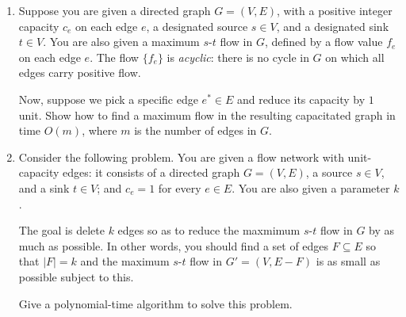 \documentclass[12pt]{article}
\begin{document}
\begin{enumerate}


\item 

Suppose you are given a directed graph $G = (V,E)$, with
a positive integer capacity $c_e$ on each edge $e$,
a designated source $s \in V$, and a designated sink $t \in V$.
You are also given a maximum $s$-$t$ flow in $G$,
defined by a flow value $f_e$ on each edge $e$.
The flow $\{f_e\}$ is {\em acyclic}: there is
no cycle in $G$ on which all edges carry positive flow.

Now, suppose we pick a specific edge $e^* \in E$
and reduce its capacity by $1$ unit.
Show how to find a maximum flow in the resulting
capacitated graph in time $O(m)$,
where $m$ is the number of edges in $G$.


\item 

Consider the following problem.
You are given a flow network with unit-capacity edges:
it consists of a directed graph $G = (V,E)$, a source $s \in V$,
and a sink $t \in V$; and $c_e = 1$ for every $e \in E$.
You are also given a parameter $k$.

The goal is delete $k$ edges so as to reduce
the maxmimum $s$-$t$ flow in $G$ by as much as possible.
In other words, you should find a set of edges $F \subseteq E$
so that $|F| = k$ and
the maximum $s$-$t$ flow in $G' = (V,E - F)$ is as
small as possible subject to this.

Give a polynomial-time algorithm to solve this problem.

\end{enumerate}
\end{document}
